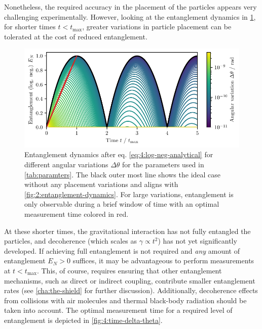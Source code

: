 Nonetheless, the required accuracy in the placement of the particles appears very challenging experimentally.
However, looking at the entanglement dynamics in \cref{fig:4:EN-dynamics-variations}, for shorter times $t<t_\mathrm{max}$, greater variations in particle placement can be tolerated at the cost of reduced entanglement.
\begin{figure}[!htbp]
  \centering
  \includegraphics[width=\textwidth]{./../figures/theta-variance/EN-dynamics-delta-theta.pdf}
  \caption{Entanglement dynamics after eq. \eqref{eq:4:log-neg-analytical} for different angular variations $\Delta \theta$ for the parameters used in \cref{tab:paramters}. The black outer most line shows the ideal case without any placement variations and aligns with \cref{fig:2:entanglement-dynamics}. For large variations, entanglement is only observable during a brief window of time with an optimal measurement time colored in red.}
  \label{fig:4:EN-dynamics-variations}
\end{figure}
At these shorter times, the gravitational interaction has not fully entangled the particles, and decoherence (which scales as $\gamma \propto t^2$) has not yet significantly developed.
If achieving full entanglement is not required and \textit{any} amount of entanglement $E_N > 0$ suffices, it may be advantageous to perform measurements at $t < t_\mathrm{max}$.
This, of course, requires ensuring that other entanglement mechanisms, such as direct or indirect coupling, contribute smaller entanglement rates (see \cref{cha:the-shield} for further discussion).
Additionally, decoherence effects from collisions with air molecules and thermal black-body radiation should be taken into account.
The optimal measurement time for a required level of entanglement is depicted in \cref{fig:4:time-delta-theta}.
